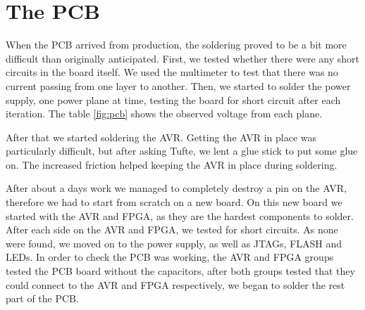\section {The PCB}



When the PCB arrived from production, the soldering proved
to be a bit more difficult than originally anticipated.
First, we tested whether
there were any short circuits in the board itself. We used the multimeter to test that
there was no current passing from one layer to another. Then, we started to solder the power supply, one power plane at time, testing the board for short
circuit after each iteration. The table \ref{fig:pcb} shows the observed voltage from each plane.



After that we started soldering the AVR. Getting the AVR in place was particularly difficult,
but after asking Tufte, we lent a glue stick to put some glue on. The increased friction helped keeping the AVR in place during soldering.

After about a days work we managed to completely destroy a pin on the AVR,
therefore we had to start from scratch on a new board. On this new board we
started with the AVR and FPGA, as they are the hardest components to
solder. After each side on the AVR and FPGA, we tested for short circuits. As
none were found, we moved on to the power supply, as well as JTAGs, FLASH and
LEDs. In order to check the PCB was working, the AVR and FPGA groups tested the
PCB board without the capacitors, after both groups tested that they could
connect to the AVR and FPGA respectively, we began to solder the rest part of
the PCB.


